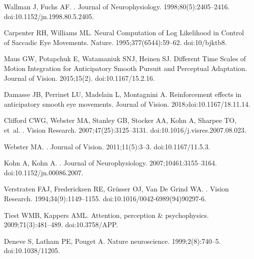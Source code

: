 \documentclass[10pt,letterpaper]{article}
\begin{document}
\begin{thebibliography}{10}
Wallman J, Fuchs AF.
.
\newblock Journal of Neurophysiology. 1998;80(5):2405--2416.
\newblock doi:{10.1152/jn.1998.80.5.2405}.

Carpenter RH, Williams ML.
\newblock Neural Computation of Log Likelihood in Control of Saccadic Eye
  Movements.
\newblock Nature. 1995;377(6544):59--62.
\newblock doi:{10/bjktb8}.

Maus GW, Potapchuk E, Watamaniuk SNJ, Heinen SJ.
\newblock Different Time Scales of Motion Integration for Anticipatory Smooth
  Pursuit and Perceptual Adaptation.
\newblock Journal of Vision. 2015;15(2).
\newblock doi:{10.1167/15.2.16}.

Damasse JB, Perrinet LU, Madelain L, Montagnini A.
\newblock Reinforcement effects in anticipatory smooth eye movements.
\newblock Journal of Vision. 2018;doi:{10.1167/18.11.14}.

Clifford CWG, Webster MA, Stanley GB, Stocker AA, Kohn A, Sharpee TO, et~al.
.
\newblock Vision Research. 2007;47(25):3125--3131.
\newblock doi:{10.1016/j.visres.2007.08.023}.

Webster MA.
.
\newblock Journal of Vision. 2011;11(5):3--3.
\newblock doi:{10.1167/11.5.3}.

Kohn A, Kohn A.
.
\newblock Journal of Neurophysiology. 2007;10461:3155--3164.
\newblock doi:{10.1152/jn.00086.2007.}

Verstraten FAJ, Fredericksen RE, Gr{\"{u}}sser OJ, {Van De Grind} WA.
.
\newblock Vision Research. 1994;34(9):1149--1155.
\newblock doi:{10.1016/0042-6989(94)90297-6}.

Tiest WMB, Kappers AML.
\newblock Attention, perception {\&} psychophysics. 2009;71(3):481--489.
\newblock doi:{10.3758/APP}.

Deneve S, Latham PE, Pouget A.
\newblock Nature neuroscience. 1999;2(8):740--5.
\newblock doi:{10.1038/11205}.


\end{thebibliography}
\end{document}
